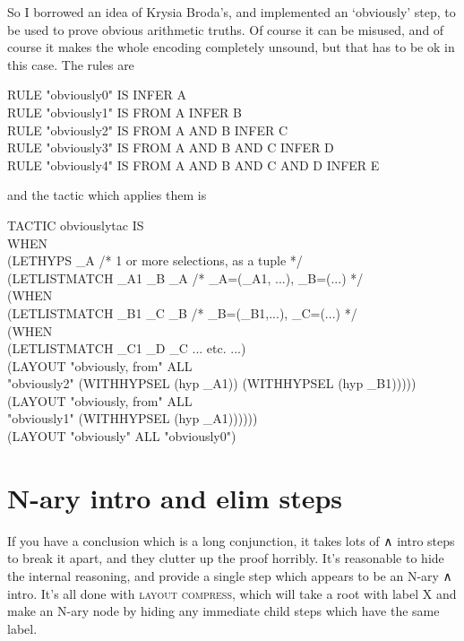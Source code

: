 So I borrowed an idea of Krysia Broda's, and implemented an `obviously' step, to be used to prove obvious arithmetic truths. Of course it can be misused, and of course it makes the whole encoding completely unsound, but that has to be ok in this case. The rules are
\begin{japeish}
RULE "obviously0" IS INFER A  \\
RULE "obviously1" IS FROM A INFER B  \\
RULE "obviously2" IS FROM A AND B INFER C  \\
RULE "obviously3" IS FROM A AND B AND C INFER D  \\
RULE "obviously4" IS FROM A AND B AND C AND D INFER E 
\end{japeish}
and the tactic which applies them is
\begin{japeish}
TACTIC obviouslytac IS \\
\tab WHEN \\
\tab (LETHYPS \_A /* 1 or more selections, as a tuple */ \\
\tab \tab (LETLISTMATCH \_A1 \_B \_A /* \_A=(\_A1, ...), \_B=(...) */ \\
\tab \tab \tab (WHEN \\
\tab \tab \tab \tab (LETLISTMATCH \_B1 \_C \_B /* \_B=(\_B1,...), \_C=(...) */ \\
\tab \tab \tab \tab \tab (WHEN \\
\tab \tab \tab \tab \tab \tab (LETLISTMATCH \_C1 \_D \_C ... etc. ...)\\
\tab \tab \tab \tab \tab \tab (LAYOUT "obviously, from" ALL \\
\tab \tab \tab \tab \tab \tab \tab "obviously2" (WITHHYPSEL (hyp \_A1)) (WITHHYPSEL (hyp \_B1))))) \\
\tab \tab \tab \tab (LAYOUT "obviously, from" ALL \\
\tab \tab \tab \tab \tab "obviously1" (WITHHYPSEL (hyp \_A1)))))) \\
\tab (LAYOUT "obviously" ALL "obviously0")
\end{japeish}

\section{N-ary intro and elim steps}

If you have a conclusion which is a long conjunction, it takes lots of ∧ intro steps to break it apart, and they clutter up the proof horribly. It's reasonable to hide the internal reasoning, and provide a single step which appears to be an N-ary ∧ intro. It's all done with \textsc{layout compress}, which will take a root with label X and make an N-ary node by hiding any immediate child steps which have the same label. 

